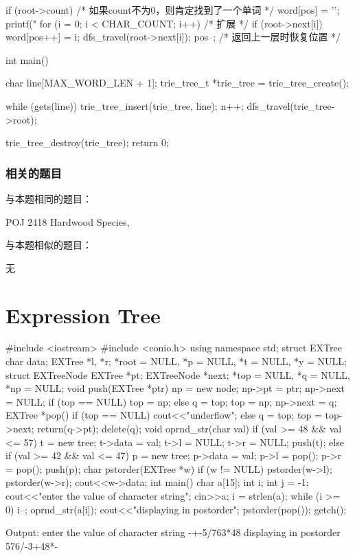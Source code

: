\begin{Codex}[label=hardwood_species.c]
{    if (root->count) { /* 如果count不为0，则肯定找到了一个单词 */
        word[pos] = '\0';
        printf("%
    }
    for (i = 0; i < CHAR_COUNT; i++) {  /* 扩展 */
        if (root->next[i]) {
            word[pos++] = i;
            dfs_travel(root->next[i]);
            pos--; /* 返回上一层时恢复位置 */
        }
    }
}

int main() {
    char line[MAX_WORD_LEN + 1];
    trie_tree_t *trie_tree = trie_tree_create();

    while (gets(line)) {
        trie_tree_insert(trie_tree, line);
        n++;
    }
    dfs_travel(trie_tree->root);

    trie_tree_destroy(trie_tree);
    return 0;
}
\end{Codex}


\subsubsection{相关的题目}
与本题相同的题目：
\begindot
\item POJ 2418 Hardwood Species, 
\myenddot

与本题相似的题目：
\begindot
\item 无
\myenddot

\section{Expression Tree} %
\begin{Codex}
	#include <iostream>
	#include <conio.h>
	using namespace std;
	struct EXTree{
		char data;
		EXTree *l, *r;
	}*root = NULL, *p = NULL, *t = NULL, *y = NULL;
	struct EXTreeNode{
		EXTree *pt;
		EXTreeNode *next;
	}*top = NULL, *q = NULL, *np = NULL;
	void push(EXTree *ptr)
	{
		np = new node;
		np->pt = ptr;
		np->next = NULL;
		if (top == NULL)
		{
			top = np;
		}
		else
		{
			q = top;
			top = np;
			np->next = q;
		}
	}
	EXTree *pop()
	{
		if (top == NULL)
		{
			cout<<"underflow\n";
		}
		else
		{
			q = top;
			top = top->next;
			return(q->pt);
			delete(q);
		}
	}
	void oprnd_str(char val)
	{
		if (val >= 48 && val <= 57)
		{
			t = new tree;
			t->data = val;
			t->l = NULL;
			t->r = NULL;
			push(t);
		}
		else if (val >= 42 && val <= 47)
		{
			p = new tree;
			p->data = val;
			p->l = pop();
			p->r = pop();
			push(p);
		}
	}
	char pstorder(EXTree *w)
	{
		if (w != NULL)
		{
			pstorder(w->l);
			pstorder(w->r);
			cout<<w->data;
		}
	}
	int main()
	{
		char a[15];
		int i;
		int j = -1;
		cout<<"enter the value of character string\n";
		cin>>a;
		i = strlen(a);
		while (i >= 0)
		{
			i--;
			oprnd_str(a[i]);
		}
		cout<<"displaying in postorder\n";
		pstorder(pop());
		getch();
	}
	
	
	Output:
	enter the value of character string
	-+-5/763*48
	displaying in postorder
	576/-3+48*-
\end{Codex}

